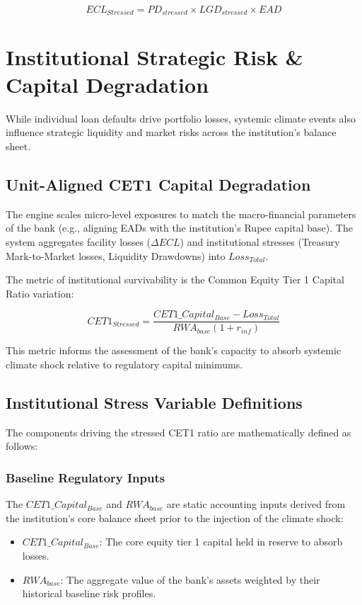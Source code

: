 \documentclass[11pt]{article}
\begin{document}
\begin{equation}
ECL_{Stressed} = PD_{stressed} \times LGD_{stressed} \times EAD
\end{equation}

\section{Institutional Strategic Risk \& Capital Degradation}
While individual loan defaults drive portfolio losses, systemic climate events also influence strategic liquidity and market risks across the institution's balance sheet.

\subsection{Unit-Aligned CET1 Capital Degradation}
The engine scales micro-level exposures to match the macro-financial parameters of the bank (e.g., aligning EADs with the institution's Rupee capital base). The system aggregates facility losses ($\Delta ECL$) and institutional stresses (Treasury Mark-to-Market losses, Liquidity Drawdowns) into $Loss_{Total}$.

The metric of institutional survivability is the Common Equity Tier 1 Capital Ratio variation:

\begin{equation}
CET1_{Stressed} = \frac{CET1\_Capital_{Base} - Loss_{Total}}{RWA_{base}(1 + r_{inf})}
\end{equation}

This metric informs the assessment of the bank's capacity to absorb systemic climate shock relative to regulatory capital minimums.

\subsection{Institutional Stress Variable Definitions}
The components driving the stressed CET1 ratio are mathematically defined as follows:

\subsubsection{Baseline Regulatory Inputs}
The $CET1\_Capital_{Base}$ and $RWA_{base}$ are static accounting inputs derived from the institution's core balance sheet prior to the injection of the climate shock:
\begin{itemize}
    \item $CET1\_Capital_{Base}$: The core equity tier 1 capital held in reserve to absorb losses.
    \item $RWA_{base}$: The aggregate value of the bank's assets weighted by their historical baseline risk profiles.
\end{itemize}
\end{document}
